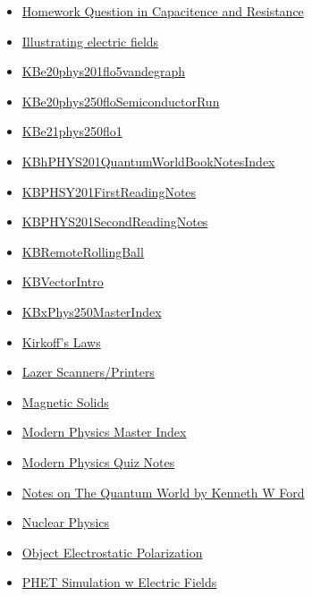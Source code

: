 \documentclass[11pt]{article}
\begin{document}
\begin{itemize}
\begin{itemize}
\begin{itemize}
\item \href{physics/modern\_physics/KBe20phys250retCapacitenceResistanceQuestion.org}{Homework Question in Capacitence and Resistance}
\item \href{physics/modern\_physics/KBhPHYS201IllustratingElectricFields.org}{Illustrating electric fields}
\item \href{physics/modern\_physics/KBe20phys201flo5vandegraph.org}{KBe20phys201flo5vandegraph}
\item \href{physics/modern\_physics/KBe20phys250floSemiconductorRun.org}{KBe20phys250floSemiconductorRun}
\item \href{physics/modern\_physics/KBe21phys250flo1.org}{KBe21phys250flo1}
\item \href{physics/modern\_physics/KBhPHYS201QuantumWorldBookNotesIndex.org}{KBhPHYS201QuantumWorldBookNotesIndex}
\item \href{physics/modern\_physics/KBPHSY201FirstReadingNotes.org}{KBPHSY201FirstReadingNotes}
\item \href{physics/modern\_physics/KBPHYS201SecondReadingNotes.org}{KBPHYS201SecondReadingNotes}
\item \href{physics/modern\_physics/KBRemoteRollingBall.org}{KBRemoteRollingBall}
\item \href{physics/modern\_physics/KBVectorIntro.org}{KBVectorIntro}
\item \href{physics/modern\_physics/KBxPhys250MasterIndex.org}{KBxPhys250MasterIndex}
\item \href{physics/modern\_physics/KBhPHYS201KirkoffsLaws.org}{Kirkoff's Laws}
\item \href{physics/modern\_physics/KBhPHYS201LazerPrinters.org}{Lazer Scanners/Printers}
\item \href{physics/modern\_physics/KBhPHYS201MagneticSolids.org}{Magnetic Solids}
\item \href{physics/modern\_physics/KBPHYS250MasterIndex.org}{Modern Physics Master Index}
\item \href{physics/modern\_physics/KBPHYS201ZachsPhysicsNotesForTest.org}{Modern Physics Quiz Notes}
\item \href{physics/modern\_physics/KBe21phys250floTheQuantumWorldBook.org}{Notes on The Quantum World by Kenneth W Ford}
\item \href{physics/modern\_physics/KBhPHYS201NuclearPhysics.org}{Nuclear Physics}
\item \href{physics/modern\_physics/KBhPHYS201ElectrostaticPolarization.org}{Object Electrostatic Polarization}
\item \href{physics/modern\_physics/KBhPHYS201PHETElectricFields.org}{PHET Simulation w Electric Fields}

\end{itemize}
\end{itemize}
\end{itemize}
\end{document}

